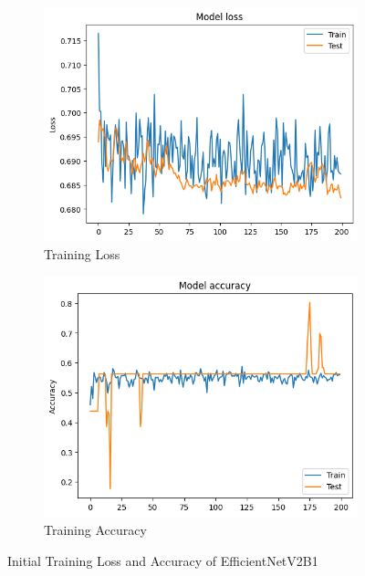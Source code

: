 \documentclass[]{final_report}
\begin{document}
\begin{figure}[ht!]
  \centering
  \begin{subfigure}{0.4\textwidth}
    \includegraphics[width=\linewidth]{images/EfficientNetV2B1-initial-training-loss.png}
    \caption{Training Loss}
    \label{fig:EfficientNetV2B1-initial-training-loss}
  \end{subfigure}
  \begin{subfigure}{0.4\textwidth}
    \includegraphics[width=\linewidth]{images/EfficientNetV2B1-initial-training-accuracy.png}
    \caption{Training Accuracy}
    \label{fig:EfficientNetV2B1-initial-training-accuracy}
  \end{subfigure}
  \caption{Initial Training Loss and Accuracy of EfficientNetV2B1}
  \label{fig:EfficientNetV2B1-initial-training}
\end{figure}
\end{document}
